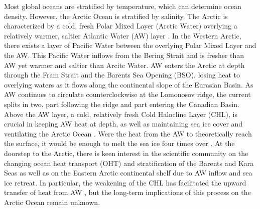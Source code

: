 \documentclass[a4paper,12pt]{article}
\begin{document}
        Most global oceans are stratified by temperature, which can determine ocean density. However, the Arctic Ocean is stratified by salinity. The Arctic is characterized by a cold, fresh Polar Mixed Layer (Arctic Water) overlying a relatively warmer, saltier Atlantic Water (AW) layer \cite{Nansen1902,Carmack2007}. In the Western Arctic, there exists a layer of Pacific Water between the overlying Polar Mixed Layer and the AW. This Pacific Water inflows from the Bering Strait and is fresher than AW yet warmer and saltier than Arcitc Water. AW enters the Arctic at depth through the Fram Strait and the Barents Sea Opening (BSO), losing heat to overlying waters as it flows along the continental slope of the Eurasian Basin. As AW continues to circulate counterclockwise at the Lomonosov ridge, the current splits in two, part following the ridge and part entering the Canadian Basin. Above the AW layer, a cold, relatively fresh Cold Halocline Layer (CHL), is crucial in keeping AW heat at depth, as well as maintaining sea ice cover and ventilating the Arctic Ocean \cite{Wang2020}. Were the heat from the AW to theoretically reach the surface, it would be enough to melt the sea ice four times over \cite{Polyakov2017}. At the doorstep to the Arctic, there is keen interest in the scientific community on the changing ocean heat transport (OHT) and stratification of the Barents and Kara Seas as well as on the Eastern Arctic continental shelf due to AW inflow and sea ice retreat. In particular, the weakening of the CHL has facilitated the upward transfer of heat from AW \cite{Polyakov2020}, but the long-term implications of this process on the Arctic Ocean remain unknown. 
\end{document}
